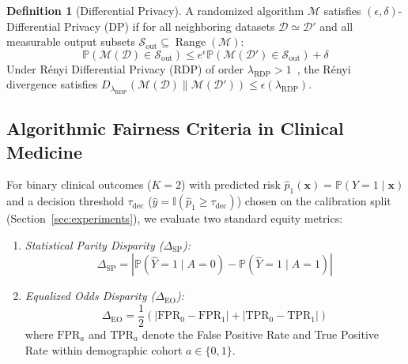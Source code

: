 \documentclass[3p,12pt]{elsarticle}
\theoremstyle{plain}
\theoremstyle{definition}
\newtheorem{definition}{Definition}
\begin{document}
\begin{definition}[Differential Privacy]
A randomized algorithm $\mathcal{M}$ satisfies $(\epsilon, \delta)$-Differential Privacy (DP) if for all neighboring datasets $\mathcal{D} \simeq \mathcal{D}'$ and all measurable output subsets $\mathcal{S}_{\text{out}} \subseteq \operatorname{Range}(\mathcal{M})$:
\begin{equation}
    \mathbb{P}(\mathcal{M}(\mathcal{D}) \in \mathcal{S}_{\text{out}}) \le e^\epsilon \mathbb{P}(\mathcal{M}(\mathcal{D}') \in \mathcal{S}_{\text{out}}) + \delta
\end{equation}
Under Rényi Differential Privacy (RDP) of order $\lambda_{\text{RDP}} > 1$~\cite{mironov2017renyi}, the Rényi divergence satisfies $D_{\lambda_{\text{RDP}}}(\mathcal{M}(\mathcal{D}) \parallel \mathcal{M}(\mathcal{D}')) \le \epsilon(\lambda_{\text{RDP}})$.
\end{definition}

\subsection{Algorithmic Fairness Criteria in Clinical Medicine}
For binary clinical outcomes ($K=2$) with predicted risk $\hat{p}_1(\mathbf{x}) = \mathbb{P}(Y=1 \mid \mathbf{x})$ and a decision threshold $\tau_{\text{dec}}$ ($\hat{y} = \mathbb{I}(\hat{p}_1 \ge \tau_{\text{dec}})$) chosen on the calibration split (Section~\ref{sec:experiments}), we evaluate two standard equity metrics:
\begin{enumerate}
    \item \emph{Statistical Parity Disparity ($\Delta_{\text{SP}}$):}
    \begin{equation}
        \Delta_{\text{SP}} = |\mathbb{P}(\hat{Y} = 1 \mid A = 0) - \mathbb{P}(\hat{Y} = 1 \mid A = 1)|
    \end{equation}
    \item \emph{Equalized Odds Disparity ($\Delta_{\text{EO}}$):}
    \begin{equation}
        \Delta_{\text{EO}} = \frac{1}{2} \left( |\text{FPR}_0 - \text{FPR}_1| + |\text{TPR}_0 - \text{TPR}_1| \right)
    \end{equation}
    where $\text{FPR}_a$ and $\text{TPR}_a$ denote the False Positive Rate and True Positive Rate within demographic cohort $a \in \{0, 1\}$.
\end{enumerate}
\end{document}
